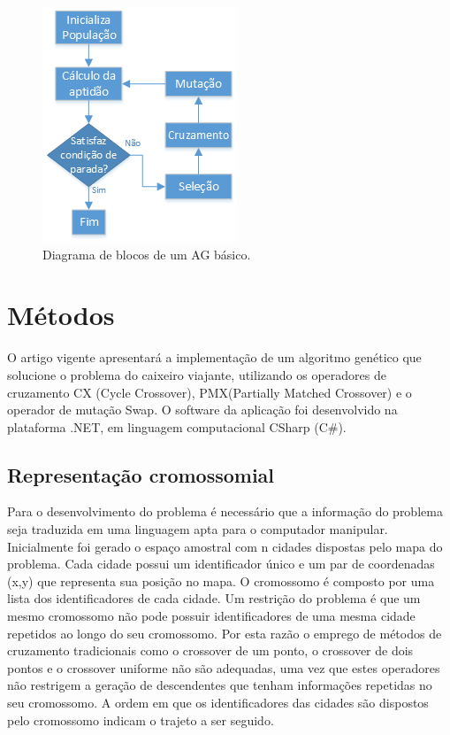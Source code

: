 \documentclass[twoside]{article}
\begin{document}
\begin{multicols}{2}
\begin{figure}[H]
  \caption{Diagrama de blocos de um AG básico.}
  \centering
    \includegraphics[scale = 1]{basicga_diagram.png}
\end{figure}


\section{Métodos}
O artigo vigente apresentará a implementação de um algoritmo genético que solucione o problema do caixeiro viajante, utilizando os operadores de cruzamento CX (Cycle Crossover), PMX(Partially Matched Crossover) e o operador de mutação Swap. O software da aplicação foi desenvolvido na plataforma .NET, em linguagem computacional CSharp (C\#).

\subsection{Representação cromossomial}
Para o desenvolvimento do problema é necessário que a informação do problema seja traduzida em uma linguagem apta para o computador manipular. Inicialmente foi gerado o espaço amostral com n cidades dispostas pelo mapa do problema. Cada cidade possui um identificador único e um par de coordenadas (x,y) que representa sua posição no mapa. O cromossomo é composto por uma lista dos identificadores de cada cidade. Um restrição do problema é que um mesmo cromossomo não pode possuir identificadores de uma mesma cidade repetidos ao longo do seu cromossomo. Por esta razão o emprego de métodos de cruzamento tradicionais como o crossover de um ponto, o crossover de dois pontos e o crossover uniforme não são adequadas, uma vez que estes operadores não restrigem a geração de descendentes que tenham informações repetidas no seu cromossomo.
A ordem em que os identificadores das cidades são dispostos pelo cromossomo indicam o trajeto a ser seguido.


\end{multicols}
\end{document}
